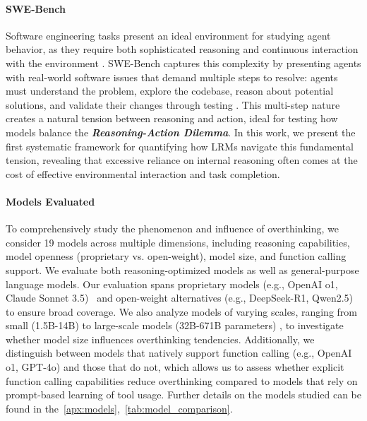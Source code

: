 \paragraph{SWE-Bench} Software engineering tasks present an ideal environment for studying agent behavior, as they require both sophisticated reasoning and continuous interaction with the environment \cite{jimenez2024swebenchlanguagemodelsresolve}. SWE-Bench captures this complexity by presenting agents with real-world software issues that demand multiple steps to resolve: agents must understand the problem, explore the codebase, reason about potential solutions, and validate their changes through testing \cite{yang2024sweagentagentcomputerinterfacesenable}. This multi-step nature creates a natural tension between reasoning and action, ideal for testing how models balance the \textbf{\textit{Reasoning-Action Dilemma}}. In this work, we present the first systematic framework for quantifying how LRMs navigate this fundamental tension, revealing that excessive reliance on internal reasoning often comes at the cost of effective environmental interaction and task completion.


\paragraph{Models Evaluated} To comprehensively study the phenomenon and influence of overthinking, we consider 19 models across multiple dimensions, including reasoning capabilities, model openness (proprietary vs. open-weight), model size, and function calling support. We evaluate both reasoning-optimized models as well as general-purpose language models. Our evaluation spans proprietary models (e.g., OpenAI o1, Claude Sonnet 3.5)~\cite{openai_learning_to_reason_2024,anthropic_claude_3_5} and open-weight alternatives (e.g., DeepSeek-R1, Qwen2.5) \cite{qwen2, qwen2.5, deepseekai2025deepseekr1incentivizingreasoningcapability} to ensure broad coverage. We also analyze models of varying scales, ranging from small (1.5B-14B) to large-scale models (32B-671B parameters) \cite{deepseek_reasoning_model}, to investigate whether model size influences overthinking tendencies. Additionally, we distinguish between models that natively support function calling (e.g., OpenAI o1, GPT-4o) \cite{openai_function_calling, openai_gpt4o_2024, openai_gpt4o_mini, openai_o1} and those that do not, which allows us to assess whether explicit function calling capabilities reduce overthinking compared to models that rely on prompt-based learning of tool usage. Further details on the models studied can be found in the~\autoref{apx:models},~\autoref{tab:model_comparison}.

